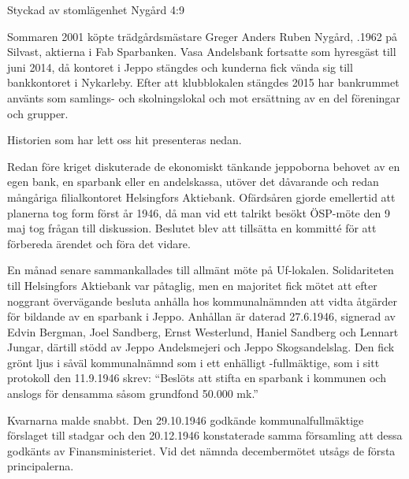


%

Styckad av stomlägenhet Nygård 4:9

%
Sommaren 2001 köpte trädgårdsmästare Greger Anders Ruben	Nygård, .1962 på Silvast, aktierna i Fab Sparbanken. Vasa 	Andelsbank fortsatte som hyresgäst till juni 2014, då kontoret i Jeppo stängdes och kunderna fick vända sig till bankkontoret i Nykarleby. Efter att klubblokalen stängdes 2015 har bankrummet använts som samlings- och skolningslokal och mot ersättning av en del föreningar och grupper.

Historien som har lett oss hit presenteras nedan.


%


Redan före kriget diskuterade de ekonomiskt tänkande jeppoborna behovet av en egen bank, en sparbank eller en andelskassa, utöver det dåvarande och redan mångåriga filialkontoret Helsingfors Aktiebank. Ofärdsåren gjorde emellertid att planerna tog form först år 1946, då man vid ett talrikt besökt ÖSP-möte den 9 maj tog frågan till diskussion. Beslutet blev att tillsätta en kommitté för att förbereda ärendet och föra det vidare.

En månad senare sammankallades till allmänt möte på Uf-lokalen. Solidariteten till Helsingfors Aktiebank var påtaglig, men en majoritet fick mötet att efter noggrant övervägande besluta anhålla hos kommunalnämnden att vidta åtgärder för bildande av en sparbank i Jeppo. Anhållan är daterad 27.6.1946, signerad av Edvin Bergman, Joel Sandberg, Ernst Westerlund, Haniel Sandberg och Lennart Jungar, därtill stödd av Jeppo Andelsmejeri och Jeppo Skogsandelslag. Den fick grönt ljus i såväl kommunalnämnd som i ett enhälligt -fullmäktige, som i sitt protokoll den 11.9.1946 skrev: ``Beslöts att stifta en sparbank i kommunen och anslogs för densamma såsom grundfond 50.000 mk.''

Kvarnarna malde snabbt. Den 29.10.1946 godkände kommunalfullmäktige förslaget till stadgar och den 20.12.1946 konstaterade samma församling att dessa godkänts av Finansministeriet. Vid det nämnda decembermötet utsågs de första principalerna.

